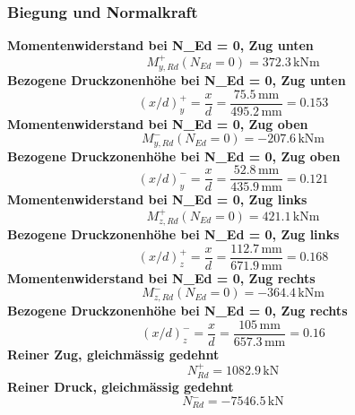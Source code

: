 \documentclass[11pt,a4paper]{article}
\begin{document}
\subsubsection{Biegung und Normalkraft}
\noindent\textbf{Momentenwiderstand bei N\_Ed = 0, Zug unten}
\begin{equation*}
M_{y,Rd}^{+}(N_{Ed} = 0) = 372.3\,\mathrm{kNm}
\end{equation*}
\noindent\textbf{Bezogene Druckzonenhöhe bei N\_Ed = 0, Zug unten}
\begin{equation*}
\left(x/d\right)_{y}^{+} = \frac{x}{d} = \frac{75.5\,\mathrm{mm}}{495.2\,\mathrm{mm}} = 0.153
\end{equation*}
\noindent\textbf{Momentenwiderstand bei N\_Ed = 0, Zug oben}
\begin{equation*}
M_{y,Rd}^{-}(N_{Ed} = 0) = -207.6\,\mathrm{kNm}
\end{equation*}
\noindent\textbf{Bezogene Druckzonenhöhe bei N\_Ed = 0, Zug oben}
\begin{equation*}
\left(x/d\right)_{y}^{-} = \frac{x}{d} = \frac{52.8\,\mathrm{mm}}{435.9\,\mathrm{mm}} = 0.121
\end{equation*}
\noindent\textbf{Momentenwiderstand bei N\_Ed = 0, Zug links}
\begin{equation*}
M_{z,Rd}^{+}(N_{Ed} = 0) = 421.1\,\mathrm{kNm}
\end{equation*}
\noindent\textbf{Bezogene Druckzonenhöhe bei N\_Ed = 0, Zug links}
\begin{equation*}
\left(x/d\right)_{z}^{+} = \frac{x}{d} = \frac{112.7\,\mathrm{mm}}{671.9\,\mathrm{mm}} = 0.168
\end{equation*}
\noindent\textbf{Momentenwiderstand bei N\_Ed = 0, Zug rechts}
\begin{equation*}
M_{z,Rd}^{-}(N_{Ed} = 0) = -364.4\,\mathrm{kNm}
\end{equation*}
\noindent\textbf{Bezogene Druckzonenhöhe bei N\_Ed = 0, Zug rechts}
\begin{equation*}
\left(x/d\right)_{z}^{-} = \frac{x}{d} = \frac{105\,\mathrm{mm}}{657.3\,\mathrm{mm}} = 0.16
\end{equation*}
\noindent\textbf{Reiner Zug, gleichmässig gedehnt}
\begin{equation*}
N_{Rd}^{+} = 1082.9\,\mathrm{kN}
\end{equation*}
\noindent\textbf{Reiner Druck, gleichmässig gedehnt}
\begin{equation*}
N_{Rd}^{-} = -7546.5\,\mathrm{kN}
\end{equation*}
\end{document}
